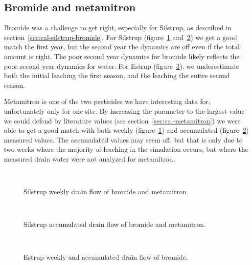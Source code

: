 \FloatBarrier
\subsection{Bromide and metamitron}

Bromide was a challenge to get right, especially for Silstrup, as
described in section~\ref{sec:cal-silstrup-bromide}.  For Silstrup
(figure~\ref{fig:Silstrup-weekly} and~\ref{fig:Silstrup-bromide-acc})
we get a good match the first year, but the second year the dynamics
are off even if the total amount is right.  The poor second year
dynamics for bromide likely reflects the poor second year dynamics for
water.  For Estrup (figure~\ref{fig:Estrup-bromide-drain}), we
underestimate both the initial leaching the first season, and the
leaching the entire second season.

Metamitron is one of the two pesticides we have interesting data for,
unfortunately only for one site.  By increasing the \kd{} parameter to
the largest value we could defend by literature values (see
section~\ref{sec:cal-metamitron}) we were able to get a good match
with both weekly (figure~\ref{fig:Silstrup-weekly}) and accumulated
(figure~\ref{fig:Silstrup-bromide-acc}) measured values.  The
accumulated values may seem off, but that is only due to two weeks
where the majority of leaching in the simulation occurs, but where the
measured drain water were not analyzed for metamitron.

\begin{figure}[htbp]
  \begin{center}
    \\
  \end{center}
  \caption{Silstrup weekly drain flow of bromide and metamitron.}
  \label{fig:Silstrup-weekly}
\end{figure}

\begin{figure}[htbp]
  \begin{center}
    \\
  \end{center}
  \caption{Silstrup accumulated drain flow of bromide and metamitron.}
  \label{fig:Silstrup-bromide-acc}
\end{figure}

\begin{figure}[htbp]
  \begin{center}
    \\
  \end{center}
  \caption{Estrup weekly and accumulated drain flow of bromide.}
  \label{fig:Estrup-bromide-drain}
\end{figure}

